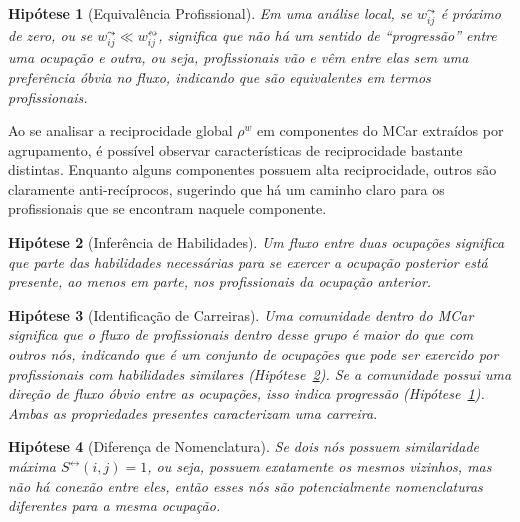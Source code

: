 \documentclass[12pt,a4paper]{article}
\theoremstyle{hypo}
\newtheorem{hypothesis}{Hipótese}
\newcommand{\linkboth}[1]{#1^\leftrightarrow} %
\newcommand{\weighted}[1]{#1^w} %
\newcommand{\recout}[1]{#1^\leadsto} %
\newcommand{\recboth}[1]{#1^\leftrightsquigarrow} %
\begin{document}
\begin{hypothesis}[Equivalência Profissional] \label{hip:equivalencia}
    Em uma análise local, se $\recout{w}_{ij}$ é próximo de zero, ou se $\recout{w}_{ij} \ll \recboth{w}_{ij}$, significa que não há um sentido de \enquote{progressão} entre uma ocupação e outra, ou seja, profissionais vão e vêm entre elas sem uma preferência óbvia no fluxo, indicando que são equivalentes em termos profissionais.
\end{hypothesis}

Ao se analisar a reciprocidade global $\weighted{\rho}$ em componentes do MCar extraídos por agrupamento, é possível observar características de reciprocidade bastante distintas. Enquanto alguns componentes possuem alta reciprocidade, outros são claramente anti-recíprocos, sugerindo que há um caminho claro para os profissionais que se encontram naquele componente.

\begin{hypothesis}[Inferência de Habilidades] \label{hip:habilidades}
    Um fluxo entre duas ocupações significa que parte das habilidades necessárias para se exercer a ocupação posterior está presente, ao menos em parte, nos profissionais da ocupação anterior.
\end{hypothesis}

\begin{hypothesis}[Identificação de Carreiras]
    Uma comunidade dentro do MCar significa que o fluxo de profissionais dentro desse grupo é maior do que com outros nós, indicando que é um conjunto de ocupações que pode ser exercido por profissionais com habilidades similares (Hipótese~\ref{hip:habilidades}). Se a comunidade possui uma direção de fluxo óbvio entre as ocupações, isso indica progressão (Hipótese~\ref{hip:equivalencia}). Ambas as propriedades presentes caracterizam uma carreira.
\end{hypothesis}

\begin{hypothesis}[Diferença de Nomenclatura]
    Se dois nós possuem similaridade máxima $\linkboth{S}(i,j) = 1$, ou seja, possuem exatamente os mesmos vizinhos, mas não há conexão entre eles, então esses nós são potencialmente nomenclaturas diferentes para a mesma ocupação.
\end{hypothesis}
\end{document}
